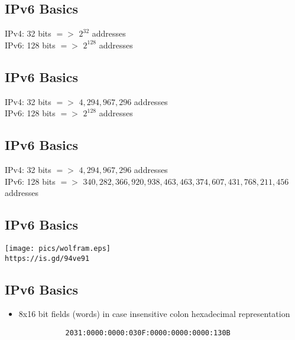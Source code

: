 \documentclass[xga]{xdvislides}
\begin{document}
\subsection{IPv6 Basics}
\Hugesize
\begin{center}
IPv4: 32 bits $=>$ $2^{32}$ addresses \\
\vspace{.5in}
IPv6: 128 bits $=>$ $2^{128}$ addresses
\end{center}
\Normalsize

\subsection{IPv6 Basics}
\Hugesize
\begin{center}
IPv4: 32 bits $=>$ $4,294,967,296$ addresses \\
\vspace{.5in}
IPv6: 128 bits $=>$ $2^{128}$ addresses
\end{center}
\Normalsize

\subsection{IPv6 Basics}
\Hugesize
\begin{center}
IPv4: 32 bits $=>$ $4,294,967,296$ addresses \\
\vspace{.5in}
IPv6: 128 bits $=>$ $340,282,366,920,938,463,463,374,607,431,768,211,456$ addresses \\
\vspace{.5in}
\end{center}
\Normalsize

\subsection{IPv6 Basics}
\vspace*{\fill}
\begin{center}
	\texttt{[image: pics/wolfram.eps]} \\
	\verb+https://is.gd/94ve91+
\end{center}
\vspace*{\fill}

\subsection{IPv6 Basics}
\begin{itemize}
	\item 8x16 bit fields (words) in case insensitive colon hexadecimal
		representation
\begin{verbatim}
           2031:0000:0000:030F:0000:0000:0000:130B
\end{verbatim}
\end{itemize}
\end{document}
